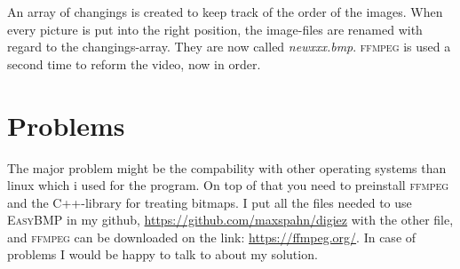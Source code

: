 \documentclass[12pt,oneside,a4paper]{article}
\begin{document}
An array of changings is created to keep track of the order of the images. When every picture is put into the right position,
the image-files are renamed with regard to the changings-array. They are now called \textit{newxxx.bmp}.
\textsc{ffmpeg} is used a second time to reform the video, now in order.

\section{Problems}
\label{sec:Problems}
The major problem might be the compability with other operating systems than linux which i used for the program. On top of
that you need to preinstall \textsc{ffmpeg} and the C++-library for treating bitmaps. I put all the files needed to use 
\textsc{EasyBMP} in my github, \url{https://github.com/maxspahn/digiez}  with the other file, and \textsc{ffmpeg} can be downloaded on the link:
\url{https://ffmpeg.org/}. 
In case of problems I would be happy to talk to about my solution.
\end{document}
